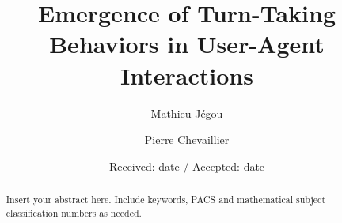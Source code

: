 \documentclass[twocolumn]{svjour3}
\begin{document}
\title{Emergence of Turn-Taking Behaviors in User-Agent Interactions}

\author{Mathieu J\'egou  \and
        Pierre Chevaillier
}


\date{Received: date / Accepted: date}

\maketitle 

\begin{abstract}
Insert your abstract here. Include keywords, PACS and mathematical
subject classification numbers as needed.
\end{abstract}


















\end{document}

